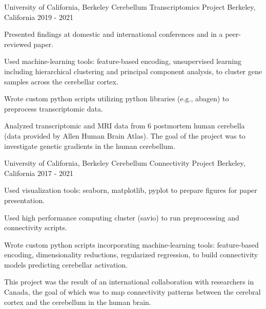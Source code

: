 \begin{cventries}
  \cventry
    {University of California, Berkeley} %
    {Cerebellum Transcriptomics Project} %
    {Berkeley, California} %
    {2019 - 2021} %
    {
      \begin{cvitems} %
      	\item {Presented findings at domestic and international conferences and in a peer-reviewed paper.}
        \item {Used machine-learning tools: feature-based encoding, unsupervised learning including hierarchical clustering and principal component analysis, to cluster gene samples across the cerebellar cortex.}
        \item {Wrote custom python scripts utilizing python libraries (e.g., abagen) to preprocess transcriptomic data.}
        \item {Analyzed transcriptomic and MRI data from 6 postmortem human cerebella (data provided by Allen Human Brain Atlas). The goal of the project was to investigate genetic gradients in the human cerebellum.}
      \end{cvitems}
    }

  \cventry
    {University of California, Berkeley} %
    {Cerebellum Connectivity Project} %
    {Berkeley, California} %
    {2017 - 2021} %
    {
      \begin{cvitems} %
        \item {Used visualization tools: seaborn, matplotlib, pyplot to prepare figures for paper presentation.}
        \item {Used high performance computing cluster (savio) to run preprocessing and connectivity scripts.}
        \item {Wrote custom python scripts incorporating machine-learning tools: feature-based encoding, dimensionality reductions, regularized regression, to build connectivity models predicting cerebellar activation.}
        \item {This project was the result of an international collaboration with researchers in Canada, the goal of which was to map connectivity patterns between the cerebral cortex and the cerebellum in the human brain.}
      \end{cvitems}
    }
    

\end{cventries}

